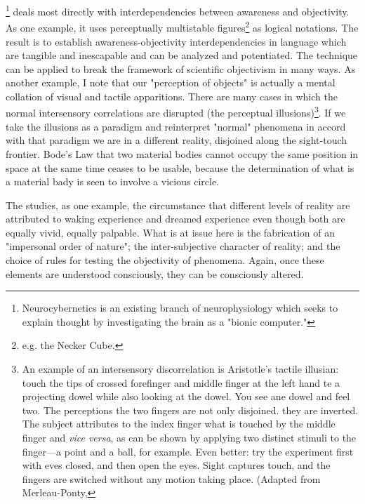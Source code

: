 \footnote{Neurocybernetics is an existing branch of neurophysiology which seeks to explain thought by investigating the brain as a "bionic computer."}
deals most directly with interdependencies between awareness and objectivity. As one example, it uses perceptually multistable figures\footnote{e.g. the Necker Cube. \cubeframe}
as logical notations. The result is to establish awareness-objectivity interdependencies in language which are tangible and inescapable and can be analyzed 
and potentiated. The technique can be applied to break the framework of scientific 
objectivism in many ways. As another example, I note that our "perception of 
objects" is actually a mental collation of visual and tactile apparitions. There are 
many cases in which the normal intersensory correlations are disrupted (the perceptual illusions)\footnote{
An example of an intersensory discorrelation is Aristotle's tactile illusian: touch the tips of crossed forefinger and middle finger at the left hand te a projecting dowel while also looking at the dowel. You see ane dowel and feel two. The perceptions the two fingers are not only disjoined. they are inverted. The subject attributes to the index finger what is touched by the middle finger and \textit{vice versa}, as can be shown by applying two distinct stimuli to the finger---a point and a ball, for example.
Even better: try the experiment first with eves closed, and then open the eyes. Sight captures touch, and the fingers are switched without any motion taking place. (Adapted from Merleau-Ponty, }. If we take the illusions as a paradigm and reinterpret "normal" 
phenomena in accord with that paradigm we are in a different reality, disjoined 
along the sight-touch frontier. Bode's Law that two material bodies cannot occupy 
the same position in space at the same time ceases to be usable, because the 
determination of what is a material bady is seen to involve a vicious circle. 

The  studies, as one example, the circumstance 
that different levels of reality are attributed to waking experience and dreamed 
experience even though both are equally vivid, equally palpable. What is at issue 
here is the fabrication of an "impersonal order of nature"; the inter-subjective 
character of reality; and the choice of rules for testing the objectivity of phenomena. 
Again, once these elements are understood consciously, they can be consciously 
altered. 

